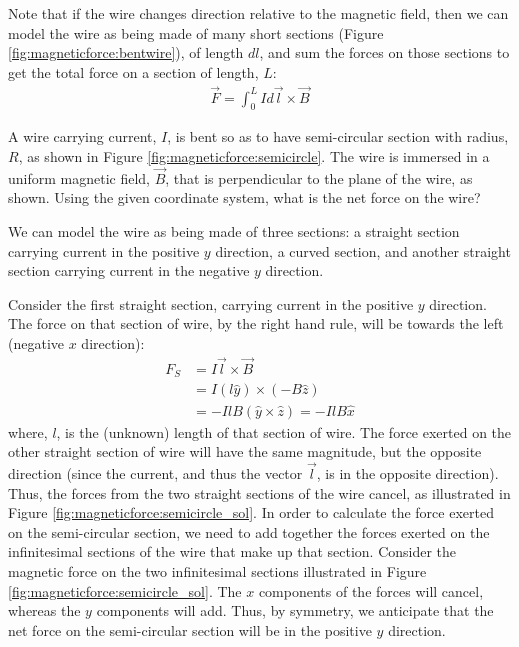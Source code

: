 Note that if the wire changes direction relative to the magnetic field, then we can model the wire as being made of many short sections (Figure \ref{fig:magneticforce:bentwire}), of length $dl$, and sum the forces on those sections to get the total force on a section of length, $L$:
\begin{align*}
\vec F = \int_0^L I d\vec l \times \vec B
\end{align*}

\begin{example}{\label{ex:magneticforce:semicircle}A wire carrying current, $I$, is bent so as to have semi-circular section with radius, $R$, as shown in Figure \ref{fig:magneticforce:semicircle}. The wire is immersed in a uniform magnetic field, $\vec B$, that is perpendicular to the plane of the wire, as shown. Using the given coordinate system, what is the net force on the wire? }

We can model the wire as being made of three sections: a straight section carrying current in the positive $y$ direction, a curved section, and another straight section carrying current in the negative $y$ direction.

Consider the first straight section, carrying current in the positive $y$ direction. The force on that section of wire, by the right hand rule, will be towards the left (negative $x$ direction):
\begin{align*}
F_S &= I \vec l \times \vec B\\
&= I (l\hat y) \times (-B\hat z)\\
&= -IlB (\hat y \times \hat z)=-IlB\hat x
\end{align*}
where, $l$, is the (unknown) length of that section of wire. The force exerted on the other straight section of wire will have the same magnitude, but the opposite direction (since the current, and thus the vector $\vec l$, is in the opposite direction). Thus, the forces from the two straight sections of the wire cancel, as illustrated in Figure \ref{fig:magneticforce:semicircle_sol}.
In order to calculate the force exerted on the semi-circular section, we need to add together the forces exerted on the infinitesimal sections of the wire that make up that section. Consider the magnetic force on the two infinitesimal sections illustrated in Figure \ref{fig:magneticforce:semicircle_sol}. The $x$ components of the forces will cancel, whereas the $y$ components will add. Thus, by symmetry, we anticipate that the net force on the semi-circular section will be in the positive $y$ direction.


\end{example}
